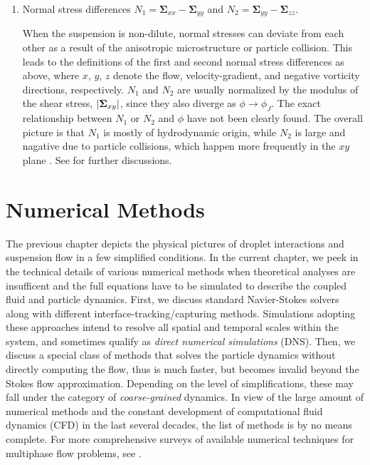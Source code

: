 \begin{enumerate}
\item Normal stress differences $N_1=\bm{\Sigma}_{xx}-\bm{\Sigma}_{yy}$ and $N_2=\bm{\Sigma}_{yy}-\bm{\Sigma}_{zz}$.

\medskip
When the suspension is non-dilute, normal stresses can deviate from each other as a result of the anisotropic microstructure or particle collision.
This leads to the definitions of the first and second normal stress differences as above, where $x$, $y$, $z$ denote the flow, velocity-gradient, and negative vorticity directions, respectively.
$N_1$ and $N_2$ are usually normalized by the modulus of the shear stress, $\lvert\bm{\Sigma}_{xy}\rvert$, since they also diverge as $\phi \to \phi_J$.
The exact relationship between $N_1$ or $N_2$ and $\phi$ have not been clearly found. The overall picture is that $N_1$ is mostly of hydrodynamic origin, while $N_2$ is large and nagative due to particle collisions, which happen more frequently in the $xy$ plane \citep{guazzelli_pouliquen_2018}.
See \cite{seto_giusteri_2018} for further discussions.

\end{enumerate}



\chapter{Numerical Methods}


The previous chapter depicts the physical pictures of droplet interactions and suspension flow in a few simplified conditions.
In the current chapter, we peek in the technical details of various numerical methods when theoretical analyses are insufficent and the full equations have to be simulated to describe the coupled fluid and particle dynamics.
First, we discuss standard Navier-Stokes solvers along with different interface-tracking/capturing methods. Simulations adopting these approaches intend to resolve all spatial and temporal scales within the system, and sometimes qualify as \emph{direct numerical simulations} (DNS).
Then, we discuss a special class of methods that solves the particle dynamics without directly computing the flow, thus is much faster, but becomes invalid beyond the Stokes flow approximation. Depending on the level of simplifications, these may fall under the category of \emph{coarse-grained} dynamics.
In view of the large amount of numerical methods and the constant development of computational fluid dynamics (CFD) in the last several decades, the list of methods is by no means complete. For more comprehensive surveys of available numerical techniques for multiphase flow problems, see \cite{prosperetti_tryggvason_2007, Rosti2019}.


